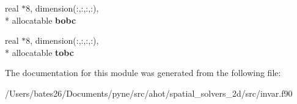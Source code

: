 \begin{DoxyCompactItemize}
\item 
\hypertarget{classinvar_ac88ff3a97a0eccbee288774e812dce01}{real $\ast$8, dimension(\+:,\+:,\+:,\+:), \\*
allocatable {\bfseries bobc}}\label{classinvar_ac88ff3a97a0eccbee288774e812dce01}

\item 
\hypertarget{classinvar_ae61fcd8c1e76af2c5a1700a1beea040e}{real $\ast$8, dimension(\+:,\+:,\+:,\+:), \\*
allocatable {\bfseries tobc}}\label{classinvar_ae61fcd8c1e76af2c5a1700a1beea040e}

\end{DoxyCompactItemize}


The documentation for this module was generated from the following file\+:\begin{DoxyCompactItemize}
\item 
/\+Users/bates26/\+Documents/pyne/src/ahot/spatial\+\_\+solvers\+\_\+2d/src/invar.\+f90\end{DoxyCompactItemize}
